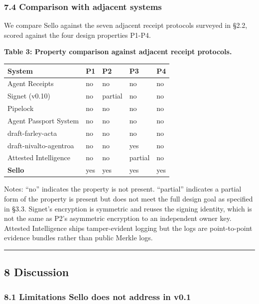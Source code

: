 \documentclass[
  11pt,
]{article}
\begin{document}
\hypertarget{comparison-with-adjacent-systems}{%
\subsubsection{7.4 Comparison with adjacent
systems}\label{comparison-with-adjacent-systems}}

We compare Sello against the seven adjacent receipt protocols surveyed
in §2.2, scored against the four design properties P1-P4.

\textbf{Table 3: Property comparison against adjacent receipt
protocols.}

\begin{longtable}[]{@{}lllll@{}}
\toprule\noalign{}
System & P1 & P2 & P3 & P4 \\
\midrule\noalign{}
\endhead
\bottomrule\noalign{}
\endlastfoot
Agent Receipts & no & no & no & no \\
Signet (v0.10) & no & partial & no & no \\
Pipelock & no & no & no & no \\
Agent Passport System & no & no & no & no \\
draft-farley-acta & no & no & no & no \\
draft-nivalto-agentroa & no & no & yes & no \\
Attested Intelligence & no & no & partial & no \\
\textbf{Sello} & yes & yes & yes & yes \\
\end{longtable}

Notes: ``no'' indicates the property is not present. ``partial''
indicates a partial form of the property is present but does not meet
the full design goal as specified in §3.3. Signet's encryption is
symmetric and reuses the signing identity, which is not the same as P2's
asymmetric encryption to an independent owner key. Attested Intelligence
ships tamper-evident logging but the logs are point-to-point evidence
bundles rather than public Merkle logs.

\begin{center}\rule{0.5\linewidth}{0.5pt}\end{center}

\hypertarget{discussion}{%
\subsection{8 Discussion}\label{discussion}}

\hypertarget{limitations-sello-does-not-address-in-v0.1}{%
\subsubsection{8.1 Limitations Sello does not address in
v0.1}\label{limitations-sello-does-not-address-in-v0.1}}
\end{document}
